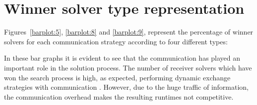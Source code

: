 


\section{Winner solver type representation}

Figures~\ref{barplot:5}, \ref{barplot:8} and \ref{barplot:9}, represent the percentage of winner solvers for each communication strategy according to four different types:


In these bar graphs it is evident to see that the communication has played an important role in the solution process. The number of receiver solvers which have won the search process is high, as expected, performing dynamic exchange strategies with communication \oneTn. However, due to the huge traffic of information, the communication overhead makes the resulting runtimes not competitive. 

